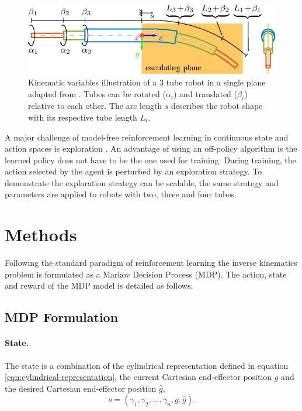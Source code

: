 \begin{figure}
  \includegraphics[width=\linewidth]{2-Figure2-1.png}
\caption{Kinematic variables illustration of a 3 tube robot in a single plane adapted from \cite{Grassmann2018}. Tubes can be rotated ($\alpha_i$) and translated ($\beta_i$) relative to each other. The arc length $s$ describes the robot shape with its respective tube length $L_i$.}
\label{fig:constraints}
\end{figure}

A major challenge of model-free reinforcement learning in continuous state and action spaces is exploration \cite{Nair2018}. An advantage of using an off-policy algorithm is the learned policy does not have to be the one used for training. During training, the action selected by the agent is perturbed by an exploration strategy. To demonstrate the exploration strategy can be scalable, the same strategy and parameters are applied to robots with two, three and four tubes.
\section{Methods}
Following the standard paradigm of reinforcement learning the inverse kinematics problem is formulated as a Markov Decision Process (MDP). The action, state and reward of the MDP model is detailed as follows.
\subsection{MDP Formulation}
\paragraph{State.} The state is a combination of the cylindrical representation defined in equation \ref{eqn:cylindrical-representation}, the current Cartesian end-effector position $g$ and the desired Cartesian end-effector position $\hat{g}$,
\begin{equation}
s = \left( \gamma_1, \gamma_2, \dots, \gamma_n, g, \hat{g} \right). \label{eqn:state}
\end{equation}

